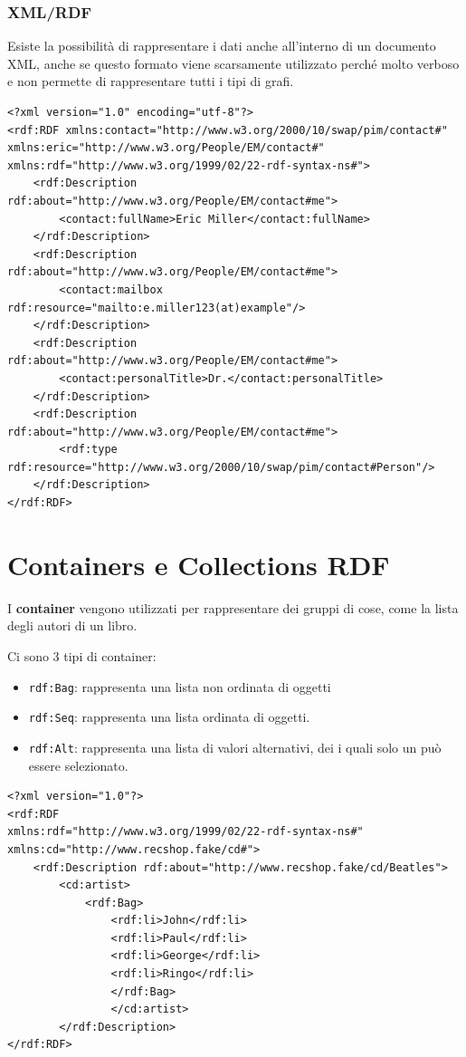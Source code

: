 \subsubsection{XML/RDF}

Esiste la possibilità di rappresentare i dati anche all'interno di un documento XML, anche se questo formato viene scarsamente utilizzato perché molto verboso e non permette di rappresentare tutti i tipi di grafi.

\begin{lstlisting}
<?xml version="1.0" encoding="utf-8"?>
<rdf:RDF xmlns:contact="http://www.w3.org/2000/10/swap/pim/contact#" xmlns:eric="http://www.w3.org/People/EM/contact#" xmlns:rdf="http://www.w3.org/1999/02/22-rdf-syntax-ns#">
	<rdf:Description rdf:about="http://www.w3.org/People/EM/contact#me">
		<contact:fullName>Eric Miller</contact:fullName>
	</rdf:Description>
	<rdf:Description rdf:about="http://www.w3.org/People/EM/contact#me">
		<contact:mailbox rdf:resource="mailto:e.miller123(at)example"/>
	</rdf:Description>
	<rdf:Description rdf:about="http://www.w3.org/People/EM/contact#me">
		<contact:personalTitle>Dr.</contact:personalTitle>
	</rdf:Description>
	<rdf:Description rdf:about="http://www.w3.org/People/EM/contact#me">
		<rdf:type rdf:resource="http://www.w3.org/2000/10/swap/pim/contact#Person"/>
	</rdf:Description>
</rdf:RDF>
\end{lstlisting}

\section{Containers e Collections RDF}

I \textbf{container} vengono utilizzati per rappresentare dei gruppi di cose, come la lista degli autori di un libro.

Ci sono 3 tipi di container:

\begin{itemize}
	\item \texttt{rdf:Bag}: rappresenta una lista non ordinata di oggetti
	\item \texttt{rdf:Seq}: rappresenta una lista ordinata di oggetti.
	\item \texttt{rdf:Alt}: rappresenta una lista di valori alternativi, dei i quali solo un può essere selezionato.
\end{itemize}
\FloatBarrier
\begin{lstlisting}[caption=Esempio di Bag con XML/RDF]
<?xml version="1.0"?>
<rdf:RDF
xmlns:rdf="http://www.w3.org/1999/02/22-rdf-syntax-ns#" 
xmlns:cd="http://www.recshop.fake/cd#"> 
	<rdf:Description rdf:about="http://www.recshop.fake/cd/Beatles">
		<cd:artist>
			<rdf:Bag>
				<rdf:li>John</rdf:li>
				<rdf:li>Paul</rdf:li>
				<rdf:li>George</rdf:li>
				<rdf:li>Ringo</rdf:li>
				</rdf:Bag>
				</cd:artist>
		</rdf:Description>
</rdf:RDF>
\end{lstlisting}

